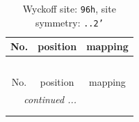\documentclass[fleqn,8pt]{jsarticle}
\begin{document}
\renewcommand{\arraystretch}{1.2}
\begin{longtable}{ccc}
\caption{Wyckoff site: {\tt 96h}, site symmetry: {\tt ..2'}}
 \\
 \hline \hline
No. & position & mapping \\ \hline \endfirsthead

\multicolumn{2}{l}{\tablename\ \thetable{}} \\
 \hline \hline
No. & position & mapping \\ \hline \endhead

 \hline \hline
\multicolumn{2}{r}{\footnotesize\it continued ...} \\ \endfoot

 \hline \hline
\multicolumn{2}{r}{} \\ \endlastfoot


\end{longtable}
\end{document}
